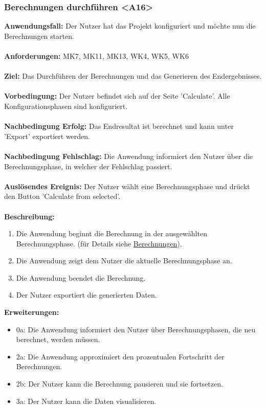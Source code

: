 \documentclass[parskip=full]{scrartcl} %
\begin{document}
\subsubsection*{Berechnungen durchführen <A16>}
\textbf{Anwendungsfall:} Der Nutzer hat das Projekt konfiguriert und möchte nun die Berechnungen starten.\\\\
\textbf{Anforderungen:} MK7, MK11, MK13, WK4, WK5, WK6\\\\
\textbf{Ziel:} Das Durchführen der Berechnungen und das Generieren des Endergebnisses.\\\\
\textbf{Vorbedingung:} Der Nutzer befindet sich auf der Seite 'Calculate'. Alle Konfigurationsphasen sind konfiguriert.\\\\
\textbf{Nachbedingung Erfolg:} Das Endresultat ist berechnet und kann unter 'Export' exportiert werden. \\\\
\textbf{Nachbedingung Fehlschlag:} Die Anwendung informiert den Nutzer über die Berechnungsphase, in welcher der Fehlschlag passiert. \\\\
\textbf{Auslösendes Ereignis:} Der Nutzer wählt eine Berechnungsphase und drückt den Button 'Calculate from selected'.\\\\
\textbf{Beschreibung:}
\begin{enumerate}
    \item Die Anwendung beginnt die Berechnung in der ausgewählten Berechnungsphase. (für Details siehe \hyperlink{calculations}{Berechnungen}).
    \item Die Anwendung zeigt dem Nutzer die aktuelle Berechnungsphase an.
    \item Die Anwendung beendet die Berechnung.
    \item Der Nutzer exportiert die generierten Daten.
\end{enumerate}
\textbf{Erweiterungen:} 
\begin{itemize}
    \item 0a: Die Anwendung informiert den Nutzer über Berechnungsphasen, die neu berechnet, werden müssen.
    \item 2a: Die Anwendung approximiert den prozentualen Fortschritt der Berechnungen.
    \item 2b: Der Nutzer kann die Berechnung pausieren und sie fortsetzen.
    \item 3a: Der Nutzer kann die Daten visualisieren.
\end{itemize}
\newpage
\end{document}
